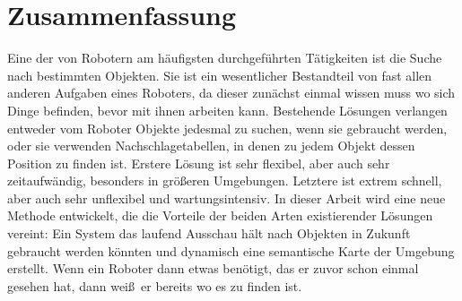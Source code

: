 \section*{Zusammenfassung}
\begin{multicols}{2}
  Eine der von Robotern am h\"aufigsten durchgef\"uhrten T\"atigkeiten ist die Suche nach bestimmten Objekten. Sie ist ein wesentlicher Bestandteil von fast allen anderen Aufgaben eines Roboters, da dieser zun\"achst einmal wissen muss wo sich Dinge befinden, bevor mit ihnen arbeiten kann. Bestehende L\"osungen verlangen entweder vom Roboter Objekte jedesmal zu suchen, wenn sie gebraucht werden, oder sie verwenden Nachschlagetabellen, in denen zu jedem Objekt dessen Position zu finden ist. Erstere L\"osung ist sehr flexibel, aber auch sehr zeitaufw\"andig, besonders in gr\"o\ss eren Umgebungen. Letztere ist extrem schnell, aber auch sehr unflexibel und wartungsintensiv. In dieser Arbeit wird eine neue Methode entwickelt, die die Vorteile der beiden Arten existierender L\"osungen vereint: Ein System das laufend Ausschau h\"alt nach Objekten in Zukunft gebraucht werden k\"onnten und dynamisch eine semantische Karte der Umgebung erstellt. Wenn ein Roboter dann etwas ben\"otigt, das er zuvor schon einmal gesehen hat, dann wei\ss\ er bereits wo es zu finden ist.
\end{multicols}

\null\cleardoublepage
\null\clearpage
